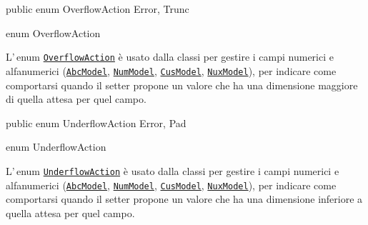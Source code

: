\documentclass[a4paper,10pt]{report}
\newif\ifesource
\newenvironment{elisting}[1][H]
  {\captionsetup{aboveskip=0pt}\begin{listing}[#1]}
  {\end{listing}%
}
\begin{document}
\ifesource
\begin{lstlisting}[language=java, 
caption=enum OverflowAction, 
label=lst:OverflowAction]
public enum OverflowAction { Error, Trunc }
\end{lstlisting}\index{OverflowAction}
\else
\begin{elisting}
\begin{javacode}
public enum OverflowAction { Error, Trunc }
\end{javacode}
\caption{enum OverflowAction}\label{lst:OverflowAction}
\end{elisting}
\fi
L'\,enum \hyperref[lst:OverflowAction]{\texttt{OverflowAction}} è usato dalla 
classi per gestire i campi numerici e alfanumerici 
(\hyperref[lst:AbcModel]{\texttt{AbcModel}},\break
\hyperref[lst:NumModel]{\texttt{NumModel}},
\hyperref[lst:CusModel]{\texttt{CusModel}},
\hyperref[lst:NuxModel]{\texttt{NuxModel}}), per indicare come comportarsi
quando il setter propone un valore che ha una dimensione maggiore di quella
attesa per quel campo.

\ifesource
\begin{lstlisting}[language=java, 
caption=enum UnderflowAction, 
label=lst:UnderflowAction]
public enum UnderflowAction { Error, Pad }
\end{lstlisting}\index{UnderflowAction}
\else
\begin{elisting}
\begin{javacode}
public enum UnderflowAction { Error, Pad }
\end{javacode}
\caption{enum UnderflowAction}\label{lst:UnderflowAction}
\end{elisting}
\fi
L'\,enum \hyperref[lst:UnderflowAction]{\texttt{UnderflowAction}} è usato dalla 
classi per gestire i campi numerici e alfanumerici 
(\hyperref[lst:AbcModel]{\texttt{AbcModel}},\break
\hyperref[lst:NumModel]{\texttt{NumModel}},
\hyperref[lst:CusModel]{\texttt{CusModel}},
\hyperref[lst:NuxModel]{\texttt{NuxModel}}), per indicare come comportarsi
quando il setter propone un valore che ha una dimensione inferiore a quella
attesa per quel campo.
\end{document}
